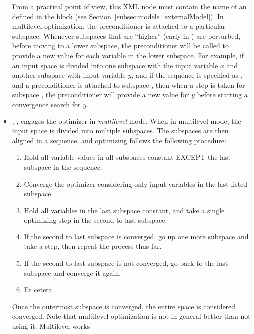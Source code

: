 \begin{itemize}
        From a practical point of view, this XML node must contain the name of
        an  defined in the  block (see
        Section~\ref{subsec:models_externalModel}).
        In multilevel optimization, the preconditioner is attached to a particular subspace.  Whenever
        subspaces that are ``higher'' (early in ) are perturbed, before moving to a lower
        subspace, the preconditioner will be called to provide a new value for each variable in the lower
        subspace.
        For example, if an input space is divided into one subspace  with the input variable $x$ and
        another subspace  with input variable $y$, and if the sequence is specified as
        , and a preconditioner is attached to subspace , then when a step
        is taken for subspace , the preconditioner will provide a new value for $y$ before
        starting a convergence search for $y$.
\item {}, , engages the optimizer in \emph{multilevel}
        mode.  When in multilevel mode, the input space is divided into multiple subspaces.  The subspaces are
        then aligned in a sequence, and optimizing follows the following procedure:
        \begin{enumerate}
          \item Hold all variable values in all subspaces constant EXCEPT the last subspace in the sequence.
          \item Converge the optimizer considering only input variables in the last listed subspace.
          \item Hold all variables in the last subspace constant, and take a single optimizing step in the
            second-to-last subspace.
          \item If the second to last subspace is converged, go up one more subspace and take a step, then
            repeat the process thus far.
          \item If the second to last subspace is not converged, go back to the last subspace and converge it
            again.
          \item Et cetera.
        \end{enumerate}
        Once the outermost subspace is converged, the entire space is considered converged.
        Note that multilevel optimization is not in general better than not using it.  Multilevel works

\end{itemize}
